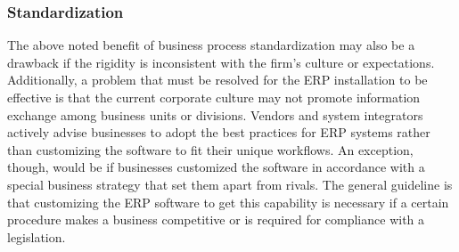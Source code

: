 \subsubsection{Standardization}
The above noted benefit of business process standardization may also be a drawback if the rigidity is inconsistent with the firm's culture or expectations. Additionally, a problem that must be resolved for the ERP installation to be effective is that the current corporate culture may not promote information exchange among business units or divisions. Vendors and system integrators actively advise businesses to adopt the best practices for ERP systems rather than customizing the software to fit their unique workflows. An exception, though, would be if businesses customized the software in accordance with a special business strategy that set them apart from rivals. The general guideline is that customizing the ERP software to get this capability is necessary if a certain procedure makes a business competitive or is required for compliance with a legislation.

